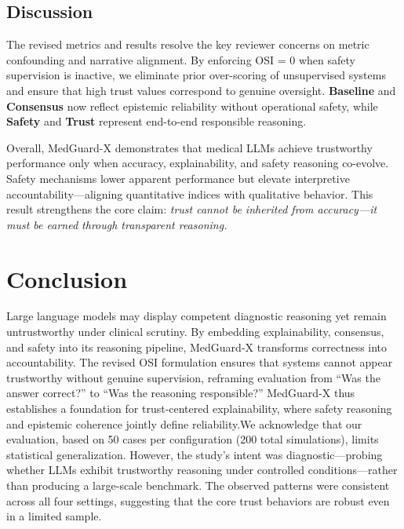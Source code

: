 \documentclass[letterpaper]{article} %
\begin{document}
\subsection{Discussion}

The revised metrics and results resolve the key reviewer concerns on metric confounding and narrative alignment.  
By enforcing OSI = 0 when safety supervision is inactive, we eliminate prior over-scoring of unsupervised systems and ensure that high trust values correspond to genuine oversight.  
\textbf{Baseline} and \textbf{Consensus} now reflect epistemic reliability without operational safety, while \textbf{Safety} and \textbf{Trust} represent end-to-end responsible reasoning.

Overall, MedGuard-X demonstrates that medical LLMs achieve trustworthy performance only when accuracy, explainability, and safety reasoning co-evolve.  
Safety mechanisms lower apparent performance but elevate interpretive accountability—aligning quantitative indices with qualitative behavior.  
This result strengthens the core claim: \emph{trust cannot be inherited from accuracy—it must be earned through transparent reasoning.}

\section{Conclusion}
\label{sec:conclusion}

Large language models may display competent diagnostic reasoning yet remain untrustworthy under clinical scrutiny.  
By embedding explainability, consensus, and safety into its reasoning pipeline, MedGuard-X transforms correctness into accountability.  
The revised OSI formulation ensures that systems cannot appear trustworthy without genuine supervision, reframing evaluation from ``Was the answer correct?'' to ``Was the reasoning responsible?''  
MedGuard-X thus establishes a foundation for trust-centered explainability, where safety reasoning and epistemic coherence jointly define reliability.We acknowledge that our evaluation, based on 50 cases per configuration (200 total simulations), limits statistical generalization. 
However, the study’s intent was diagnostic—probing whether LLMs exhibit trustworthy reasoning under controlled conditions—rather than producing a large-scale benchmark. 
The observed patterns were consistent across all four settings, suggesting that the core trust behaviors are robust even in a limited sample.
\end{document}
